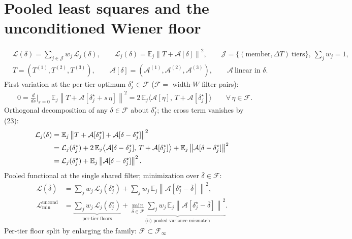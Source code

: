 \documentclass[11pt]{article}
\newcommand{\DT}{\Delta T}
\newcommand{\norm}[1]{\left\lVert #1 \right\rVert}
\newcommand{\E}{\mathbb{E}}
\begin{document}
\section{Pooled least squares and the unconditioned Wiener floor}

\begin{align}
&\mathcal{L}(\delta)=\sum_{j\in\mathcal{J}} w_j\,\mathcal{L}_j(\delta),
\qquad
\mathcal{L}_j(\delta)=\E_j\norm{T+\mathcal{A}[\delta]}^{2},
\qquad
\mathcal{J}=\{(\text{member},\DT)\ \text{tiers}\},\ \textstyle\sum_j w_j=1,\\
&T=(T^{(1)},T^{(2)},T^{(3)}),\qquad
\mathcal{A}[\delta]=(\mathcal{A}^{(1)},\mathcal{A}^{(2)},\mathcal{A}^{(3)}),
\qquad \mathcal{A}\ \text{linear in }\delta .
\end{align}
First variation at the per-tier optimum $\delta^\star_j\in\mathcal{F}$
($\mathcal{F}=$ width-$W$ filter pairs):
\begin{align}
&0=\tfrac{d}{ds}\Big|_{s=0}\,
\E_j\norm{T+\mathcal{A}[\delta^\star_j+s\,\eta]}^{2}
=2\,\E_j\bigl\langle
\mathcal{A}[\eta],\,T+\mathcal{A}[\delta^\star_j]\bigr\rangle
\qquad\forall\,\eta\in\mathcal{F}.
\end{align}
Orthogonal decomposition of any $\delta\in\mathcal{F}$ about
$\delta^\star_j$; the cross term vanishes by (23):
\begin{align}
\mathcal{L}_j(\delta)
&=\E_j\norm{T+\mathcal{A}[\delta^\star_j]
+\mathcal{A}[\delta-\delta^\star_j]}^{2}\notag\\
&=\mathcal{L}_j(\delta^\star_j)
+2\,\E_j\bigl\langle \mathcal{A}[\delta-\delta^\star_j],\,
T+\mathcal{A}[\delta^\star_j]\bigr\rangle
+\E_j\norm{\mathcal{A}[\delta-\delta^\star_j]}^{2}\notag\\
&=\mathcal{L}_j(\delta^\star_j)
+\E_j\norm{\mathcal{A}[\delta-\delta^\star_j]}^{2}.
\end{align}
Pooled functional at the single shared filter; minimization over
$\bar\delta\in\mathcal{F}$:
\begin{align}
\mathcal{L}(\bar\delta)
&=\sum_j w_j\,\mathcal{L}_j(\delta^\star_j)
+\sum_j w_j\,\E_j\norm{\mathcal{A}[\delta^\star_j-\bar\delta]}^{2},\\
\mathcal{L}_{\min}^{\mathrm{uncond}}
&=\underbrace{\sum_j w_j\,\mathcal{L}_j(\delta^\star_j)}
_{\text{per-tier floors}}
+\underbrace{\min_{\bar\delta\in\mathcal{F}}
\sum_j w_j\,\E_j\norm{\mathcal{A}[\delta^\star_j-\bar\delta]}^{2}}
_{\text{(ii) pooled-variance mismatch}}.
\end{align}
Per-tier floor split by enlarging the family:
$\mathcal{F}\subset\mathcal{F}_\infty$
\end{document}
